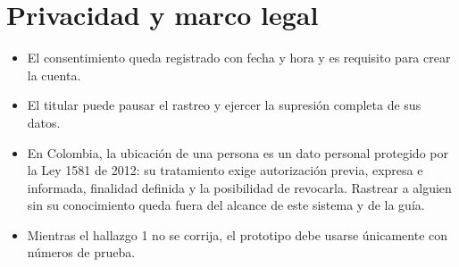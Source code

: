 \section{Privacidad y marco legal}

\begin{itemize}
  \item El consentimiento queda registrado con fecha y hora y es requisito para crear la cuenta.
  \item El titular puede pausar el rastreo y ejercer la supresión completa de sus datos.
  \item En Colombia, la ubicación de una persona es un dato personal protegido por la Ley 1581 de 2012: su tratamiento exige autorización previa, expresa e informada, finalidad definida y la posibilidad de revocarla. Rastrear a alguien sin su conocimiento queda fuera del alcance de este sistema y de la guía.
  \item Mientras el hallazgo 1 no se corrija, el prototipo debe usarse únicamente con números de prueba.
\end{itemize}